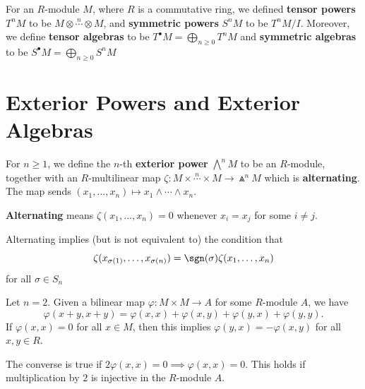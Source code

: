 
\begin{defn*}
    For an $R$-module $M$, where $R$ is a commutative ring, we defined \textbf{tensor powers} $T^nM$ to be $M \otimes \overset{n}{\cdots} \otimes M$, and \textbf{symmetric powers} $S^nM$ to be $T^nM/I$. Moreover, we define \textbf{tensor algebras} to be $T^\bullet M = \bigoplus_{n \geq 0}T^nM$ and \textbf{symmetric algebras} to be $S^\bullet M = \bigoplus_{n \geq 0}S^nM$
\end{defn*}

\section{Exterior Powers and Exterior Algebras}

\begin{defn}
    For $n\geq 1$, we define the $n$-th \textbf{exterior power} $\bigwedge^nM$ to be an $R$-module, together with an $R$-multilinear map $\zeta: M \times \overset{n}{\cdots} \times M \to \Wedge^nM$ which is \textbf{alternating}. The map sends $(x_1,\dots,x_n) \mapsto x_1 \land \cdots \land x_n$.

    \textbf{Alternating} means $\zeta (x_1,\dots,x_n) = 0$ whenever $x_i = x_j$ for some $i \neq j$.
\end{defn}

\begin{prop}
    Alternating implies (but is not equivalent to) the condition that
    $$\zeta ( x_{\sigma(1)},\dots,x_{\sigma(n)})= \sgn (\sigma) \zeta(x_1,\dots,x_n)$$
    for all $\sigma \in S_n$
\end{prop}

\begin{prop}
    Let $n=2$. Given a bilinear map $\varphi :M \times M \to A$ for some $R$-module $A$, we have
    $$\varphi(x+y,x+y)=\varphi(x,x) + \varphi(x,y) + \varphi (y,x) + \varphi(y,y).$$
    If $\varphi (x,x)=0$ for all $x \in M$, then this implies $\varphi ( y,x) = - \varphi(x,y)$ for all $x,y \in R$.

    The converse is true if $2 \varphi(x,x) = 0 \implies \varphi (x,x) = 0$. This holds if multiplication by $2$ is injective in the $R$-module $A$.
\end{prop}

